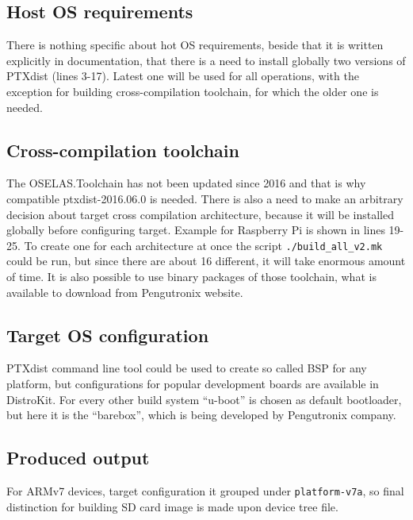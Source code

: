 \documentclass[printmode]{mgr}
\begin{document}
\subsection*{Host OS requirements}

There is nothing specific about hot OS requirements, beside that it is written explicitly in documentation, that there is a need to install globally two versions of PTXdist (lines 3-17).
Latest one will be used for all operations, with the exception for building cross-compilation toolchain, for which the older one is needed.

\subsection*{Cross-compilation toolchain}

The OSELAS.Toolchain has not been updated since 2016 and that is why compatible ptxdist-2016.06.0 is needed.
There is also a need to make an arbitrary decision about target cross compilation architecture, because it will be installed globally before configuring target.
Example for Raspberry Pi is shown in lines 19-25.
To create one for each architecture at once the script \verb|./build_all_v2.mk| could be run, but since there are about 16 different, it will take enormous amount of time.
It is also possible to use binary packages of those toolchain, what is available to download from Pengutronix website.

\subsection*{Target OS configuration}

PTXdist command line tool could be used to create so called BSP for any platform, but configurations for popular development boards are available in DistroKit.
For every other build system ``u-boot'' is chosen as default bootloader, but here it is the ``barebox'', which is being developed by Pengutronix company.

\subsection*{Produced output}

For ARMv7 devices, target configuration it grouped under \verb|platform-v7a|, so final distinction for building SD card image is made upon device tree file.


\end{document}
